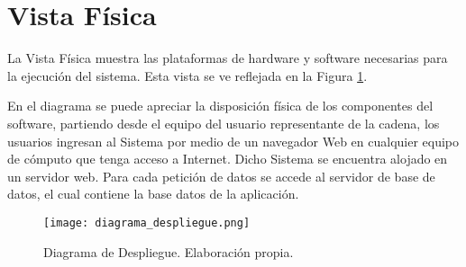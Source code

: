 \vskip 1.5cm
\section{Vista Física} \label{vistaFisica}
La Vista Física muestra las plataformas de hardware y software necesarias para la ejecución del sistema. Esta vista se ve reflejada en la Figura \ref{fig:diagrama_despliegue}.

En el diagrama se puede apreciar la disposición física de los componentes del software, partiendo desde el equipo del usuario representante de la cadena, los usuarios ingresan al Sistema por medio de un navegador Web en cualquier equipo de cómputo que tenga acceso a Internet. Dicho Sistema se encuentra alojado en un servidor web. Para cada petición de datos se accede al servidor de base de datos, el cual contiene la base datos de la aplicación.

\begin{figure}[H]
   \texttt{[image: diagrama\_despliegue.png]}
   \caption{Diagrama de Despliegue. Elaboración propia.}
   \label{fig:diagrama_despliegue}
   \centering
\end{figure}
